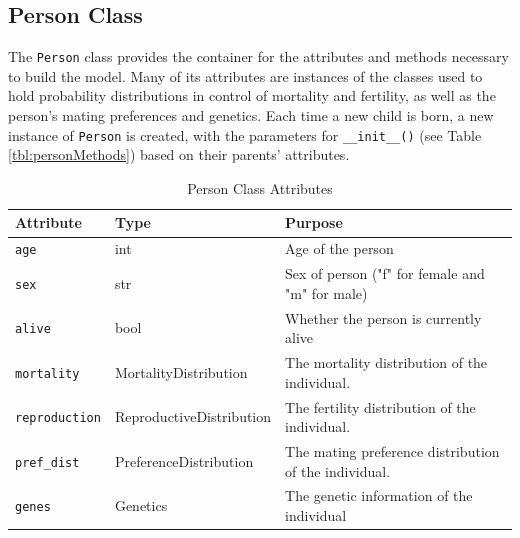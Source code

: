 \documentclass[authoryearcitations]{UoYCSproject}
\begin{document}
\newpage
\subsection{Person Class}
The \texttt{Person} class provides the container for the attributes and methods necessary to build the model. Many of its attributes are instances of the classes used to hold probability distributions in control of mortality and fertility, as well as the person's mating preferences and genetics. Each time a new child is born, a new instance of \texttt{Person} is created, with the parameters for \texttt{\_\_init\_\_()} (see Table \ref{tbl:personMethods}) based on their parents' attributes.

\begin{table}[h]
\caption{Person Class Attributes}
\label{tbl:personAttributes}
\begin{tabular}{l l m{5cm}}
\textbf{Attribute} & \textbf{Type} & \textbf{Purpose} \\\hline
\texttt{age} & int & Age of the person \\\hline
\texttt{sex} & str & Sex of person ("f" for female and "m" for male) \\\hline
\texttt{alive} & bool & Whether the person is currently alive \\\hline
\texttt{mortality} & MortalityDistribution & The mortality distribution of the individual. \\\hline
\texttt{reproduction} & ReproductiveDistribution & The fertility distribution of the individual. \\\hline
\texttt{pref\_dist} & PreferenceDistribution & The mating preference distribution of the individual. \\\hline 
\texttt{genes} & Genetics & The genetic information of the individual
\end{tabular}
\end{table}
\end{document}
